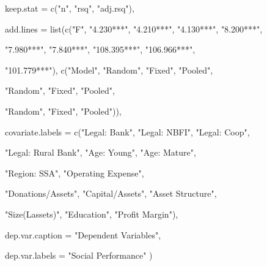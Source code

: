 \documentclass[a4paper,nobind]{templates/ociamthesis}
\newenvironment{Shaded}{\begin{snugshade}}{\end{snugshade}}
\newcommand{\AttributeTok}[1]{\textcolor[rgb]{0.77,0.63,0.00}{#1}}
\newcommand{\FunctionTok}[1]{\textcolor[rgb]{0.00,0.00,0.00}{#1}}
\newcommand{\NormalTok}[1]{#1}
\newcommand{\StringTok}[1]{\textcolor[rgb]{0.31,0.60,0.02}{#1}}
\renewenvironment{Shaded}
{
  \vspace{10pt}%
  \begin{snugshade}%
}{%
  \end{snugshade}%
  \vspace{8pt}%
}
\begin{document}
\begin{landscape}
\begin{Shaded}
\begin{Highlighting}[]
\AttributeTok{keep.stat =} \FunctionTok{c}\NormalTok{(}\StringTok{"n"}\NormalTok{, }\StringTok{"rsq"}\NormalTok{, }\StringTok{"adj.rsq"}\NormalTok{),}


\AttributeTok{add.lines =} \FunctionTok{list}\NormalTok{(}\FunctionTok{c}\NormalTok{(}\StringTok{"F"}\NormalTok{, }\StringTok{"4.230***"}\NormalTok{, }\StringTok{"4.210***"}\NormalTok{, }\StringTok{"4.130***"}\NormalTok{, }\StringTok{"8.200***"}\NormalTok{, }
                   
                   \StringTok{"7.980***"}\NormalTok{, }\StringTok{"7.840***"}\NormalTok{, }\StringTok{"108.395***"}\NormalTok{, }\StringTok{"106.966***"}\NormalTok{, }
                   
                   \StringTok{"101.779***"}\NormalTok{), }\FunctionTok{c}\NormalTok{(}\StringTok{"Model"}\NormalTok{, }\StringTok{"Random"}\NormalTok{, }\StringTok{"Fixed"}\NormalTok{, }\StringTok{"Pooled"}\NormalTok{, }
                   
                   \StringTok{"Random"}\NormalTok{, }\StringTok{"Fixed"}\NormalTok{, }\StringTok{"Pooled"}\NormalTok{, }
                   
                   \StringTok{"Random"}\NormalTok{, }\StringTok{"Fixed"}\NormalTok{, }\StringTok{"Pooled"}\NormalTok{)),}

\AttributeTok{covariate.labels =} \FunctionTok{c}\NormalTok{(}\StringTok{"Legal: Bank"}\NormalTok{, }\StringTok{"Legal: NBFI"}\NormalTok{, }\StringTok{"Legal: Coop"}\NormalTok{, }
                     
                     \StringTok{"Legal: Rural Bank"}\NormalTok{, }\StringTok{"Age: Young"}\NormalTok{, }\StringTok{"Age: Mature"}\NormalTok{, }
                     
                     \StringTok{"Region: SSA"}\NormalTok{, }\StringTok{"Operating Expense"}\NormalTok{, }
                     
                     \StringTok{"Donations/Assets"}\NormalTok{, }\StringTok{"Capital/Assets"}\NormalTok{, }\StringTok{"Asset Structure"}\NormalTok{, }
                     
                     \StringTok{"Size(Lassets)"}\NormalTok{, }\StringTok{"Education"}\NormalTok{, }\StringTok{"Profit Margin"}\NormalTok{), }

\AttributeTok{dep.var.caption  =} \StringTok{"Dependent Variables"}\NormalTok{,}

  \AttributeTok{dep.var.labels   =} \StringTok{"Social Performance"}
\NormalTok{)}
\end{Highlighting}
\end{Shaded}


\end{landscape}
\end{document}
